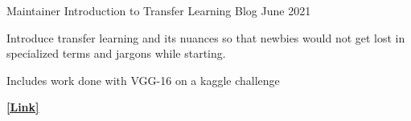

\begin{cventries}

  \cventry
    {Maintainer} %
    {Introduction to Transfer Learning} %
    {Blog} %
    {June 2021} %
    {
      \begin{cvitems} %
        \item {Introduce transfer learning and its nuances so that newbies would not get lost in specialized terms and jargons while starting.}
        \item {Includes work done with VGG-16 on a kaggle challenge}
        \item {\href{https://chanbong.github.io/2021/06/01/transfer_learning.html}{\bf [Link]}}
      \end{cvitems}
    }

\end{cventries}
